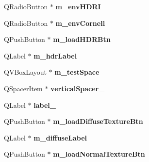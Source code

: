 \begin{DoxyCompactItemize}
\item 
\hypertarget{classUi__MainWindow_a83cf8e88e731ea891bd270a115cdb0e9}{Q\-Radio\-Button $\ast$ {\bfseries m\-\_\-env\-H\-D\-R\-I}}\label{classUi__MainWindow_a83cf8e88e731ea891bd270a115cdb0e9}

\item 
\hypertarget{classUi__MainWindow_af522f7ddf11195c01f36a1578a6d11e4}{Q\-Radio\-Button $\ast$ {\bfseries m\-\_\-env\-Cornell}}\label{classUi__MainWindow_af522f7ddf11195c01f36a1578a6d11e4}

\item 
\hypertarget{classUi__MainWindow_a703ff1513ff398c7b5f61df969aa7ea6}{Q\-Push\-Button $\ast$ {\bfseries m\-\_\-load\-H\-D\-R\-Btn}}\label{classUi__MainWindow_a703ff1513ff398c7b5f61df969aa7ea6}

\item 
\hypertarget{classUi__MainWindow_aeff4caa85bba13d82137b17649aa612b}{Q\-Label $\ast$ {\bfseries m\-\_\-hdr\-Label}}\label{classUi__MainWindow_aeff4caa85bba13d82137b17649aa612b}

\item 
\hypertarget{classUi__MainWindow_a05bfb9646afa4e3e653ad3048a95cf32}{Q\-V\-Box\-Layout $\ast$ {\bfseries m\-\_\-test\-Space}}\label{classUi__MainWindow_a05bfb9646afa4e3e653ad3048a95cf32}

\item 
\hypertarget{classUi__MainWindow_a2e4c63737c14e5af736837df590fe004}{Q\-Spacer\-Item $\ast$ {\bfseries vertical\-Spacer\-\_}}\label{classUi__MainWindow_a2e4c63737c14e5af736837df590fe004}

\item 
\hypertarget{classUi__MainWindow_a2e2516d755e4dd53fc905dabddf2738a}{Q\-Label $\ast$ {\bfseries label\-\_}}\label{classUi__MainWindow_a2e2516d755e4dd53fc905dabddf2738a}

\item 
\hypertarget{classUi__MainWindow_a49cf25f777f2e2f9b4afe06d8fd809ce}{Q\-Push\-Button $\ast$ {\bfseries m\-\_\-load\-Diffuse\-Texture\-Btn}}\label{classUi__MainWindow_a49cf25f777f2e2f9b4afe06d8fd809ce}

\item 
\hypertarget{classUi__MainWindow_a723466a941b8d4798e82e7323dff37b0}{Q\-Label $\ast$ {\bfseries m\-\_\-diffuse\-Label}}\label{classUi__MainWindow_a723466a941b8d4798e82e7323dff37b0}

\item 
\hypertarget{classUi__MainWindow_a5a78a415eca27cce6e6bedf270dfacbb}{Q\-Push\-Button $\ast$ {\bfseries m\-\_\-load\-Normal\-Texture\-Btn}}\label{classUi__MainWindow_a5a78a415eca27cce6e6bedf270dfacbb}


\end{DoxyCompactItemize}
